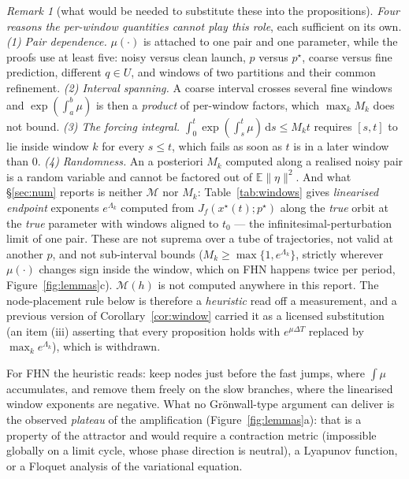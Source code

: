 \documentclass[11pt]{article}
\theoremstyle{remark}\newtheorem{remark}{Remark}
\newcommand{\pstar}{p^\star}
\newcommand{\norm}[1]{\lVert #1\rVert}
\newcommand{\dd}{\,\mathrm{d}}
\begin{document}
\begin{remark}[what would be needed to substitute these into the propositions]
{\emph{Four reasons the per-window quantities cannot play this role}, each sufficient on its own. \emph{(1) Pair dependence.} $\mu(\cdot)$ is attached to one pair and one parameter, while the proofs use at least five: noisy versus clean launch, $p$ versus $\pstar$, coarse versus fine prediction, different $q\in U$, and windows of two partitions and their common refinement. \emph{(2) Interval spanning.} A coarse interval crosses several fine windows and $\exp(\int_a^b\mu)$ is then a \emph{product} of per-window factors, which $\max_kM_k$ does not bound. \emph{(3) The forcing integral.} $\int_0^t\exp(\int_s^t\mu)\dd s\le M_kt$ requires $[s,t]$ to lie inside window $k$ for every $s\le t$, which fails as soon as $t$ is in a later window than $0$. \emph{(4) Randomness.} An a posteriori $M_k$ computed along a realised noisy pair is a random variable and cannot be factored out of $\mathbb E\norm\eta^2$.
And what \S\ref{sec:num} reports is neither $\mathcal M$ nor $M_k$: Table~\ref{tab:windows} gives \emph{linearised endpoint} exponents $e^{\Lambda_k}$ computed from $J_f(x^\star(t);\pstar)$ along the \emph{true} orbit at the \emph{true} parameter with windows aligned to $t_0$ --- the infinitesimal-perturbation limit of one pair. These are not suprema over a tube of trajectories, not valid at another $p$, and not sub-interval bounds ($M_k\ge\max\{1,e^{\Lambda_k}\}$, strictly wherever $\mu(\cdot)$ changes sign inside the window, which on FHN happens twice per period, Figure~\ref{fig:lemmas}c). $\mathcal M(h)$ is not computed anywhere in this report. The node-placement rule below is therefore a \emph{heuristic} read off a measurement, and a previous version of Corollary~\ref{cor:window} carried it as a licensed substitution (an item (iii) asserting that every proposition holds with $e^{\mu\Delta T}$ replaced by $\max_ke^{\Lambda_k}$), which is withdrawn.}
\end{remark}

For FHN the heuristic reads: keep nodes just before the fast jumps, where $\int\mu$ accumulates, and remove them freely on the slow branches, where the linearised window exponents are negative. What no Gr\"onwall-type argument can deliver is the observed \emph{plateau} of the amplification (Figure~\ref{fig:lemmas}a): that is a property of the attractor and would require a contraction metric (impossible globally on a limit cycle, whose phase direction is neutral), a Lyapunov function, or a Floquet analysis of the variational equation.
\end{document}
